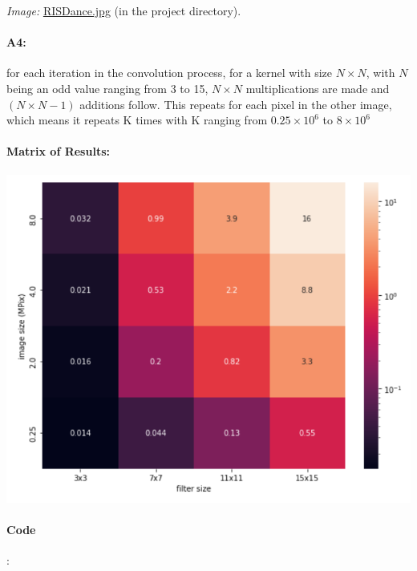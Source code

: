 \emph{Image:} \href{RISDance.jpg}{RISDance.jpg} (in the project directory).

\paragraph{A4:} for each iteration in the convolution process, for a kernel with size $N\times N$, with $N$ being an odd value ranging from 3 to 15, $N\times N$ multiplications are made and  $(N\times N-1)$ additions follow. This repeats for each pixel in the other image, which means it repeats K times with K ranging from $0.25\times10^{6}$ to $8\times10^{6}$

\paragraph{Matrix of Results: }
\begin{center}
    \includegraphics[scale=0.5]{image.png}
\end{center}
\pagebreak

\paragraph{Code }:

